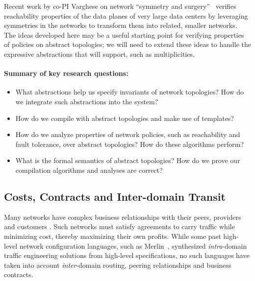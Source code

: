 Recent work by co-PI Varghese on network ``symmetry and surgery''~\cite{bjorner+:scaling-network-verification} verifies reachability properties of the data planes of very large
data centers by leveraging symmetries in the networks to  
transform them into
related, smaller networks.  The ideas
developed here may be a useful starting point for verifying properties of \Name policies on abstract topologies; we will need to extend these ideas to handle the expressive abstractions that \Name will support, such as multiplicities.  


\paragraph*{Summary of key research questions:}

\begin{itemize}
\item What abstractions help us specify invariants of network topologies? How do we integrate such abstractions into the \Name system?
\item How do we compile with abstract topologies and make use of templates?  
\item How do we analyze properties of network policies, such as
reachability and fault tolerance, over abstract
topologies?  How do these algorithms perform?
\item What is the formal 
semantics of abstract topologies?  How do we prove our
compilation algorithms and analyses are correct?
\end{itemize}

\subsection{Costs, Contracts and Inter-domain Transit}

Many networks have complex business relationships with their peers, providers and 
customers \cite{routingplaybook}.  Such networks must satisfy agreements to carry traffic 
while minimizing
cost, thereby maximizing their own profits.  While some past high-level network configuration
languages, such as Merlin~\cite{foster:merlin}, synthesized \emph{intra}-domain traffic
engineering solutions from high-level specifications, no such languages have taken into account
\emph{inter}-domain routing, peering relationships and business contracts.


